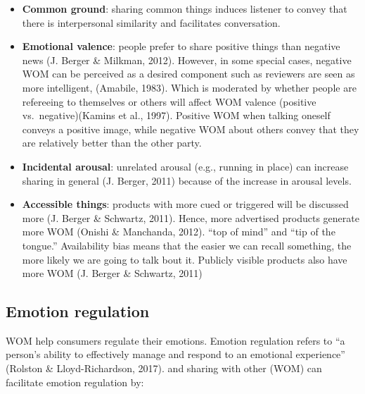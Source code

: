 \documentclass[
]{book}
\begin{document}
\begin{itemize}
\item
  \textbf{Common ground}: sharing common things induces listener to convey that there is interpersonal similarity and facilitates conversation.
\item
  \textbf{Emotional valence}: people prefer to share positive things than negative news (J. Berger \& Milkman, 2012). However, in some special cases, negative WOM can be perceived as a desired component such as reviewers are seen as more intelligent, (Amabile, 1983). Which is moderated by whether people are refereeing to themselves or others will affect WOM valence (positive vs.~negative)(Kamins et al., 1997). Positive WOM when talking oneself conveys a positive image, while negative WOM about others convey that they are relatively better than the other party.
\item
  \textbf{Incidental arousal}: unrelated arousal (e.g., running in place) can increase sharing in general (J. Berger, 2011) because of the increase in arousal levels.
\item
  \textbf{Accessible things}: products with more cued or triggered will be discussed more (J. Berger \& Schwartz, 2011). Hence, more advertised products generate more WOM (Onishi \& Manchanda, 2012). ``top of mind'' and ``tip of the tongue.'' Availability bias means that the easier we can recall something, the more likely we are going to talk bout it. Publicly visible products also have more WOM (J. Berger \& Schwartz, 2011)
\end{itemize}

\hypertarget{emotion-regulation}{%
\subsection{Emotion regulation}\label{emotion-regulation}}

WOM help consumers regulate their emotions. Emotion regulation refers to ``a person's ability to effectively manage and respond to an emotional experience'' (Rolston \& Lloyd-Richardson, 2017). and sharing with other (WOM) can facilitate emotion regulation by:
\end{document}
